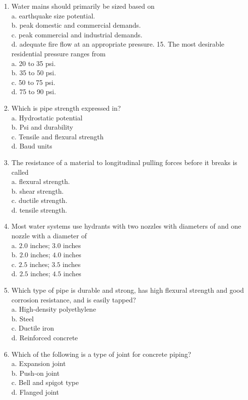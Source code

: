 \documentclass[10pt]{article}
\begin{document}
\begin{enumerate}
  \item Water mains should primarily be sized based on\\
a. earthquake size potential.\\
b. peak domestic and commercial demands.\\
c. peak commercial and industrial demands.\\
d. adequate fire flow at an appropriate pressure. 15. The most desirable residential pressure ranges from\\
a. 20 to 35 psi.\\
b. 35 to 50 psi.\\
c. 50 to 75 psi.\\
d. 75 to 90 psi.

  \item Which is pipe strength expressed in?\\
a. Hydrostatic potential\\
b. Psi and durability\\
c. Tensile and flexural strength\\
d. Baud units

  \item The resistance of a material to longitudinal pulling forces before it breaks is called\\
a. flexural strength.\\
b. shear strength.\\
c. ductile strength.\\
d. tensile strength.

  \item Most water systems use hydrants with two nozzles with diameters of and one nozzle with a diameter of\\
a. $2.0$ inches; $3.0$ inches\\
b. $2.0$ inches; $4.0$ inches\\
c. $2.5$ inches; $3.5$ inches\\
d. $2.5$ inches; $4.5$ inches

  \item Which type of pipe is durable and strong, has high flexural strength and good corrosion resistance, and is easily tapped?\\
a. High-density polyethylene\\
b. Steel\\
c. Ductile iron\\
d. Reinforced concrete

  \item Which of the following is a type of joint for concrete piping?\\
a. Expansion joint\\
b. Push-on joint\\
c. Bell and spigot type\\
d. Flanged joint


\end{enumerate}
\end{document}
